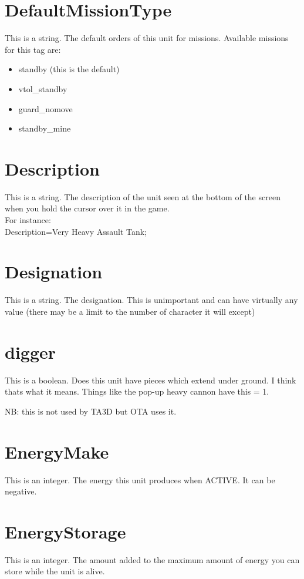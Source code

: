\documentclass[a4paper,10pt]{article}
\begin{document}
\section{DefaultMissionType}
This is a string. The default orders of this unit for missions. Available missions for this tag are:
\begin{itemize}
 \item standby (this is the default)
 \item vtol\_standby
 \item guard\_nomove
 \item standby\_mine
\end{itemize}

\section{Description}
This is a string. The description of the unit seen at the bottom of the screen when you hold the cursor over it in the game.\\
For instance:\\
Description=Very Heavy Assault Tank;

\section{Designation}
This is a string. The designation. This is unimportant and can have virtually any value (there may be a limit to the number of character it will except)

\section{digger}
This is a boolean. Does this unit have pieces which extend under ground.  I think thats what it means. Things like the pop-up heavy cannon have this = 1.

NB: this is not used by TA3D but OTA uses it.

\section{EnergyMake}
This is an integer. The energy this unit produces when ACTIVE. It can be negative.

\section{EnergyStorage}
This is an integer. The amount added to the maximum amount of energy you can store while the unit is alive.
\end{document}
